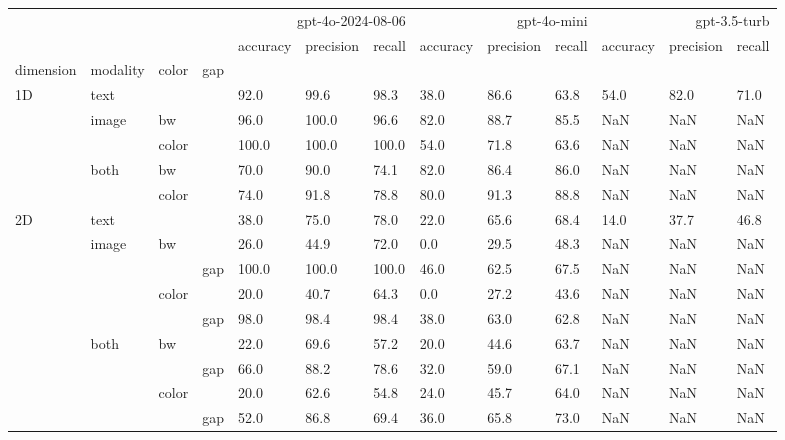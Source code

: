 \begin{tabular}{lllllllllllll}
\toprule
 &  &  &  & \multicolumn{3}{r}{gpt-4o-2024-08-06} & \multicolumn{3}{r}{gpt-4o-mini} & \multicolumn{3}{r}{gpt-3.5-turb} \\
 &  &  &  & accuracy & precision & recall & accuracy & precision & recall & accuracy & precision & recall \\
dimension & modality & color & gap &  &  &  &  &  &  &  &  &  \\
\midrule
\multirow[t]{5}{*}{1D} & text &  &  & 92.0 & 99.6 & 98.3 & 38.0 & 86.6 & 63.8 & 54.0 & 82.0 & 71.0 \\
 & \multirow[t]{2}{*}{image} & bw &  & 96.0 & 100.0 & 96.6 & 82.0 & 88.7 & 85.5 & NaN & NaN & NaN \\
 &  & color &  & 100.0 & 100.0 & 100.0 & 54.0 & 71.8 & 63.6 & NaN & NaN & NaN \\
 & \multirow[t]{2}{*}{both} & bw &  & 70.0 & 90.0 & 74.1 & 82.0 & 86.4 & 86.0 & NaN & NaN & NaN \\
 &  & color &  & 74.0 & 91.8 & 78.8 & 80.0 & 91.3 & 88.8 & NaN & NaN & NaN \\
\multirow[t]{9}{*}{2D} & text &  &  & 38.0 & 75.0 & 78.0 & 22.0 & 65.6 & 68.4 & 14.0 & 37.7 & 46.8 \\
 & \multirow[t]{4}{*}{image} & \multirow[t]{2}{*}{bw} &  & 26.0 & 44.9 & 72.0 & 0.0 & 29.5 & 48.3 & NaN & NaN & NaN \\
 &  &  & gap & 100.0 & 100.0 & 100.0 & 46.0 & 62.5 & 67.5 & NaN & NaN & NaN \\
 &  & \multirow[t]{2}{*}{color} &  & 20.0 & 40.7 & 64.3 & 0.0 & 27.2 & 43.6 & NaN & NaN & NaN \\
 &  &  & gap & 98.0 & 98.4 & 98.4 & 38.0 & 63.0 & 62.8 & NaN & NaN & NaN \\
 & \multirow[t]{4}{*}{both} & \multirow[t]{2}{*}{bw} &  & 22.0 & 69.6 & 57.2 & 20.0 & 44.6 & 63.7 & NaN & NaN & NaN \\
 &  &  & gap & 66.0 & 88.2 & 78.6 & 32.0 & 59.0 & 67.1 & NaN & NaN & NaN \\
 &  & \multirow[t]{2}{*}{color} &  & 20.0 & 62.6 & 54.8 & 24.0 & 45.7 & 64.0 & NaN & NaN & NaN \\
 &  &  & gap & 52.0 & 86.8 & 69.4 & 36.0 & 65.8 & 73.0 & NaN & NaN & NaN \\
\bottomrule
\end{tabular}
